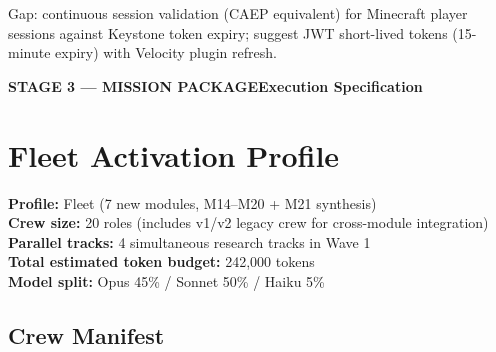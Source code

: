 \documentclass[11pt,letterpaper]{article}
\newcommand{\stageheader}[2]{%
  \begin{tcolorbox}[colback=Primary,colframe=Primary,arc=2pt,left=8pt,right=8pt,top=6pt,bottom=6pt]
    \textbf{\large\sffamily\color{white}#1}\hfill\textbf{\sffamily\color{white!80!Primary}#2}
  \end{tcolorbox}%
}
\begin{document}
Gap: continuous session validation (CAEP equivalent) for Minecraft player sessions against Keystone token expiry; suggest JWT short-lived tokens (15-minute expiry) with Velocity plugin refresh.

\newpage

\stageheader{STAGE 3 — MISSION PACKAGE}{Execution Specification}

\section{Fleet Activation Profile}

\textbf{Profile:} Fleet (7 new modules, M14--M20 + M21 synthesis)\\
\textbf{Crew size:} 20 roles (includes v1/v2 legacy crew for cross-module integration)\\
\textbf{Parallel tracks:} 4 simultaneous research tracks in Wave 1\\
\textbf{Total estimated token budget:} 242,000 tokens\\
\textbf{Model split:} Opus 45\% / Sonnet 50\% / Haiku 5\%

\subsection{Crew Manifest}
\end{document}

